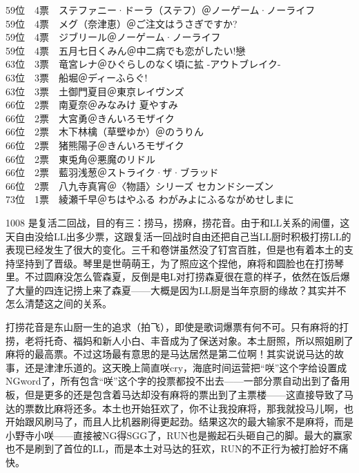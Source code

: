 {    59位　4票　ステファニー·ドーラ（ステフ）＠ノーゲーム·ノーライフ\\
    59位　4票　メグ（奈津恵）＠ご注文はうさぎですか?\\
    59位　4票　ジブリール＠ノーゲーム·ノーライフ\\
    59位　4票　五月七日くみん＠中二病でも恋がしたい!戀\\
    63位　3票　竜宮レナ＠ひぐらしのなく頃に拡 -アウトブレイク-\\
    63位　3票　船堀＠ディーふらぐ!\\
    63位　3票　土御門夏目＠東京レイヴンズ\\
    66位　2票　南夏奈＠みなみけ 夏やすみ\\
    66位　2票　大宮勇＠きんいろモザイク\\
    66位　2票　木下林檎（草壁ゆか）＠のうりん\\
    66位　2票　猪熊陽子＠きんいろモザイク\\
    66位　2票　東兎角＠悪魔のリドル\\
    66位　2票　藍羽浅葱＠ストライク·ザ·ブラッド\\
    66位　2票　八九寺真宵＠〈物語〉シリーズ セカンドシーズン\\
    73位　1票　綾瀬千早＠ちはやふる わがみよにふるながめせしまに
}

1008 是复活二回战，目的有三：捞马，捞麻，捞花音。由于和LL关系的闹僵，这天自由没给LL出多少票，这跟复活一回战时自由还把自己当LL厨时积极打捞LL的表现已经发生了很大的变化。三千和卷饼虽然没了钉宫百胜，但是也有着本土的支持坚持到了晋级。琴里是世萌萌王，为了照应这个捏他，麻将和圆脸也在打捞琴里。不过圆麻没怎么管森夏，反倒是电L对打捞森夏很在意的样子，依然在饭后爆了大量的四连记捞上来了森夏——大概是因为LL厨是当年京厨的缘故？其实并不怎么清楚这之间的关系。

打捞花音是东山厨一生的追求（拍飞），即使是歌词爆票有何不可。只有麻将的打捞，老将托奇、福妈和新人小白、丰音成为了保送对象。本土厨照，所以照姐刷了麻将的最高票。不过这场最有意思的是马达居然是第二位啊！其实说说马达的故事，还是津津乐道的。这天晚上简直咲cry，海底时间运营把“咲”这个字给设置成NGword了，所有包含“咲”这个字的投票都投不出去——一部分票自动出到了备用板，但是更多的还是包含着马达却没有麻将的票出到了主票楼——这直接导致了马达的票数比麻将还多。本土也开始狂欢了，你不让我投麻将，那我就投马儿啊，也开始跟风刷马了，而且人比机器刷得更起劲。结果这次的最大输家不是麻将，而是小野寺小咲——直接被NG得SGG了，RUN也是搬起石头砸自己的脚。最大的赢家也不是刷到了首位的LL，而是本土对马达的狂欢，RUN的不正行为被打脸好不痛快。

